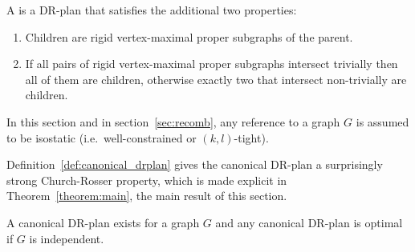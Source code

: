 \begin{definition}\label{def:canonical_drplan}
    A  is a DR-plan that satisfies the additional two properties:
    \begin{enumerate}
        \item Children are rigid vertex-maximal proper subgraphs of the parent.
        \item If all pairs of rigid vertex-maximal proper subgraphs intersect trivially then all of them are children, otherwise exactly two that intersect non-trivially are children.
    \end{enumerate}
\end{definition}


In this section and in section~\ref{sec:recomb}, any reference to a graph $G$ is assumed to be isostatic (i.e.\ well-constrained or $(k,l)$-tight).




Definition~\ref{def:canonical_drplan} gives the canonical DR-plan a surprisingly strong Church-Rosser property, which is made explicit in Theorem~\ref{theorem:main}, the main result of this section.

\begin{theorem}
\label{theorem:canonical_exists_and_is_optimal}
\label{theorem:canonical_is_optimal}
\label{theorem:main}
    A canonical DR-plan exists for a graph $G$ and any canonical DR-plan is optimal if $G$ is independent.
\end{theorem}






